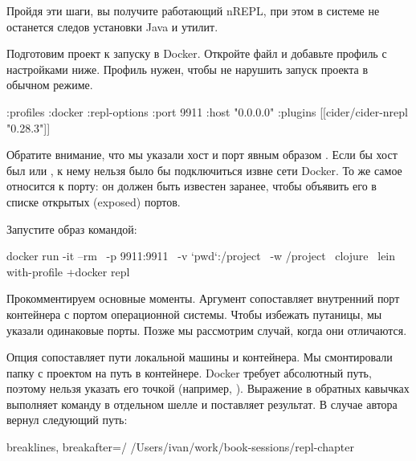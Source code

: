 Пройдя эти шаги, вы получите работающий nREPL, при этом в системе не останется следов установки Java и утилит.

Подготовим проект к запуску в Docker. Откройте файл  и добавьте профиль  с настройками ниже. Профиль нужен, чтобы не нарушить запуск проекта в обычном режиме.

\begin{english}
  \begin{clojure/lines}
:profiles
{:docker
 {:repl-options
   {:port 9911
    :host "0.0.0.0"}
  :plugins [[cider/cider-nrepl "0.28.3"]]}}
  \end{clojure/lines}
\end{english}

Обратите внимание, что мы указали хост и порт явным образом . Если бы хост был  или , к нему нельзя было бы подключиться извне сети Docker. То же самое относится к порту: он должен быть известен заранее, чтобы объявить его в списке открытых (exposed) портов.

Запустите образ командой:

\begin{english}
  \begin{bash/lines}
docker run -it --rm \
  -p 9911:9911 \
  -v `pwd`:/project \
  -w /project \
  clojure \
  lein with-profile +docker repl
  \end{bash/lines}
\end{english}

Прокомментируем основные моменты. Аргумент   сопоставляет внутренний порт контейнера с портом операционной системы. Чтобы избежать путаницы, мы указали одинаковые порты. Позже мы рассмотрим случай, когда они отличаются.

Опция \code{-v}  сопоставляет пути локальной машины и контейнера. Мы смонтировали папку с проектом на путь  в контейнере. Docker требует абсолютный путь, поэтому нельзя указать его точкой (например, ). Выражение  в обратных кавычках выполняет команду в отдельном шелле и поставляет результат. В случае автора  вернул следующий путь:

\begin{english}
  \begin{text*}{breaklines, breakafter=/}
/Users/ivan/work/book-sessions/repl-chapter
  \end{text*}
\end{english}

